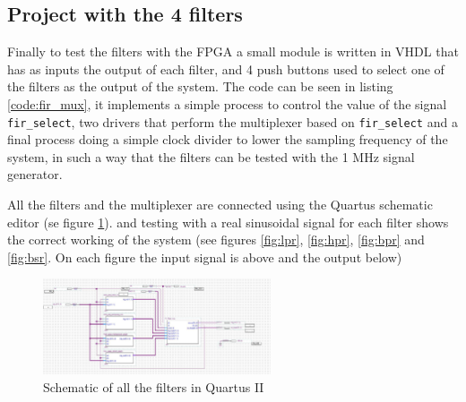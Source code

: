 \documentclass[12pt]{article}   	%
\begin{document}
\subsection{Project with the 4 filters}

Finally to test the filters with the FPGA a small module is written in VHDL that has as inputs the output of each filter, and 4 push buttons used to select one of the filters as the output of the system. The code can be seen in listing \ref{code:fir_mux}, it implements a simple process to control the value of the signal \lstinline|fir_select|, two drivers that perform the multiplexer based on \lstinline|fir_select| and a final process doing a simple clock divider to lower the sampling frequency of the system, in such a way that the filters can be tested with the 1 MHz signal generator.

All the filters and the multiplexer are connected using the Quartus schematic editor (se figure \ref{fig:filters_all}). and testing with a real sinusoidal signal for each filter shows the correct working of the system (see figures \ref{fig:lpr}, \ref{fig:hpr}, \ref{fig:bpr} and \ref{fig:bsr}. On each figure the input signal is above and the output below)

\begin{figure}[htbp]
\begin{center}
\includegraphics[width=0.6\textwidth]{img/fir_filters.jpg}
\caption{Schematic of all the filters in Quartus II}
\label{fig:filters_all}
\end{center}
\end{figure}
\end{document}
